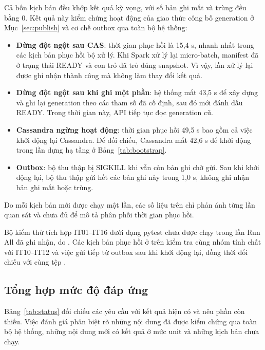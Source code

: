 Cả bốn kịch bản đều khớp kết quả kỳ vọng, với số bản ghi mất và trùng đều bằng 0. Kết quả này kiểm chứng hoạt động của giao thức công bố generation ở Mục~\ref{sec:publish} và cơ chế outbox qua toàn bộ hệ thống:
\begin{itemize}
    \item \textbf{Dừng đột ngột sau CAS}: thời gian phục hồi là 15,4 s, nhanh nhất trong các kịch bản phục hồi bộ xử lý. Khi Spark xử lý lại micro-batch, manifest đã ở trạng thái READY và con trỏ đã trỏ đúng snapshot. Vì vậy, lần xử lý lại được ghi nhận thành công mà không làm thay đổi kết quả.
    \item \textbf{Dừng đột ngột sau khi ghi một phần}: hệ thống mất 43,5 s để xây dựng và ghi lại generation theo các tham số đã cố định, sau đó mới đánh dấu READY. Trong thời gian này, API tiếp tục đọc generation cũ.
    \item \textbf{Cassandra ngừng hoạt động}: thời gian phục hồi 49,5 s bao gồm cả việc khởi động lại Cassandra. Để đối chiếu, Cassandra mất 42,6 s để khởi động trong lần dựng hạ tầng ở Bảng~\ref{tab:bootstrap}.
    \item \textbf{Outbox}: bộ thu thập bị SIGKILL khi vẫn còn bản ghi chờ gửi. Sau khi khởi động lại, bộ thu thập gửi hết các bản ghi này trong 1,0 s, không ghi nhận bản ghi mất hoặc trùng.
\end{itemize}
Do mỗi kịch bản mới được chạy một lần, các số liệu trên chỉ phản ánh từng lần quan sát và chưa đủ để mô tả phân phối thời gian phục hồi.

Bộ kiểm thử tích hợp IT01--IT16 dưới dạng pytest chưa được chạy trong lần Run All đã ghi nhận, do . Các kịch bản phục hồi ở trên kiểm tra cùng nhóm tính chất với IT10--IT12 và việc gửi tiếp từ outbox sau khi khởi động lại, đồng thời đối chiếu với cùng tệp .

\subsection{Tổng hợp mức độ đáp ứng}

Bảng~\ref{tab:status} đối chiếu các yêu cầu với kết quả hiện có và nêu phần còn thiếu. Việc đánh giá phân biệt rõ những nội dung đã được kiểm chứng qua toàn bộ hệ thống, những nội dung mới có kết quả ở mức unit và những kịch bản chưa chạy.

